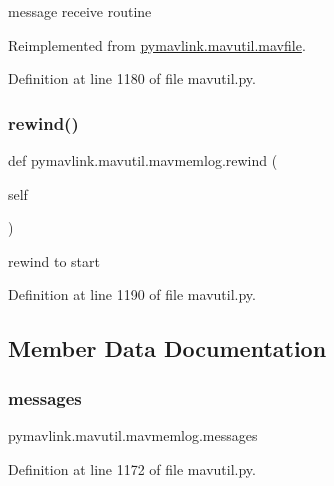 \begin{DoxyVerb}message receive routine\end{DoxyVerb}
 

Reimplemented from \mbox{\hyperlink{classpymavlink_1_1mavutil_1_1mavfile_acf32945bf305666d12d8a1bf32ae6893}{pymavlink.\+mavutil.\+mavfile}}.



Definition at line 1180 of file mavutil.\+py.

\mbox{\label{classpymavlink_1_1mavutil_1_1mavmemlog_ac3a0c1c0621a7b6ed341779bd313d493}} 
\subsubsection{\texorpdfstring{rewind()}{rewind()}}
{\footnotesize\ttfamily def pymavlink.\+mavutil.\+mavmemlog.\+rewind (\begin{DoxyParamCaption}\item[{}]{self }\end{DoxyParamCaption})}

\begin{DoxyVerb}rewind to start\end{DoxyVerb}
 

Definition at line 1190 of file mavutil.\+py.



\subsection{Member Data Documentation}
\mbox{\label{classpymavlink_1_1mavutil_1_1mavmemlog_a72353a723c995748c9d353e8b233f650}} 
\subsubsection{\texorpdfstring{messages}{messages}}
{\footnotesize\ttfamily pymavlink.\+mavutil.\+mavmemlog.\+messages}



Definition at line 1172 of file mavutil.\+py.

